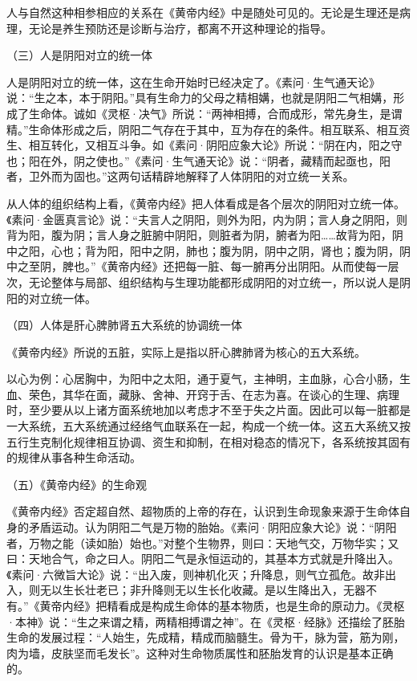 \documentclass[a4paper,12pt,UTF8,twoside]{ctexbook}
\begin{document}
人与自然这种相参相应的关系在《黄帝内经》中是随处可见的。无论是生理还是病理，无论是养生预防还是诊断与治疗，都离不开这种理论的指导。

（三）人是阴阳对立的统一体

人是阴阳对立的统一体，这在生命开始时已经决定了。《素问·生气通天论》说：“生之本，本于阴阳。”具有生命力的父母之精相媾，也就是阴阳二气相媾，形成了生命体。诚如《灵枢·决气》所说：“两神相搏，合而成形，常先身生，是谓精。”生命体形成之后，阴阳二气存在于其中，互为存在的条件。相互联系、相互资生、相互转化，又相互斗争。如《素问·阴阳应象大论》所说：“阴在内，阳之守也；阳在外，阴之使也。”《素问·生气通天论》说：“阴者，藏精而起亟也，阳者，卫外而为固也。”这两句话精辟地解释了人体阴阳的对立统一关系。

从人体的组织结构上看，《黄帝内经》把人体看成是各个层次的阴阳对立统一体。《素问·金匮真言论》说：“夫言人之阴阳，则外为阳，内为阴；言人身之阴阳，则背为阳，腹为阴；言人身之脏腑中阴阳，则脏者为阴，腑者为阳……故背为阳，阴中之阳，心也；背为阳，阳中之阴，肺也；腹为阴，阴中之阴，肾也；腹为阴，阴中之至阴，脾也。”《黄帝内经》还把每一脏、每一腑再分出阴阳。从而使每一层次，无论整体与局部、组织结构与生理功能都形成阴阳的对立统一，所以说人是阴阳的对立统一体。

（四）人体是肝心脾肺肾五大系统的协调统一体

《黄帝内经》所说的五脏，实际上是指以肝心脾肺肾为核心的五大系统。

以心为例：心居胸中，为阳中之太阳，通于夏气，主神明，主血脉，心合小肠，生血、荣色，其华在面，藏脉、舍神、开窍于舌、在志为喜。在谈心的生理、病理时，至少要从以上诸方面系统地加以考虑才不至于失之片面。因此可以每一脏都是一大系统，五大系统通过经络气血联系在一起，构成一个统一体。这五大系统又按五行生克制化规律相互协调、资生和抑制，在相对稳态的情况下，各系统按其固有的规律从事各种生命活动。

（五）《黄帝内经》的生命观

《黄帝内经》否定超自然、超物质的上帝的存在，认识到生命现象来源于生命体自身的矛盾运动。认为阴阳二气是万物的胎始。《素问·阴阳应象大论》说：“阴阳者，万物之能（读如胎）始也。”对整个生物界，则曰：天地气交，万物华实；又曰：天地合气，命之曰人。阴阳二气是永恒运动的，其基本方式就是升降出入。《素问·六微旨大论》说：“出入废，则神机化灭；升降息，则气立孤危。故非出入，则无以生长壮老已；非升降则无以生长化收藏。是以生降出入，无器不有。”《黄帝内经》把精看成是构成生命体的基本物质，也是生命的原动力。《灵枢·本神》说：“生之来谓之精，两精相搏谓之神”。在《灵枢·经脉》还描绘了胚胎生命的发展过程：“人始生，先成精，精成而脑髓生。骨为干，脉为营，筋为刚，肉为墙，皮肤坚而毛发长”。这种对生命物质属性和胚胎发育的认识是基本正确的。
\end{document}
